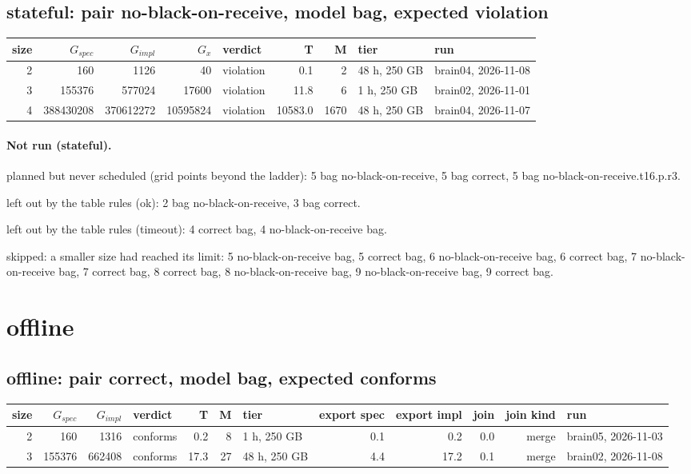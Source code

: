 \documentclass[10pt]{article}
\begin{document}
\subsection*{stateful: pair \textsf{no-black-on-receive}, model bag, expected violation}
\begin{longtable}{@{}rrrrlrrll@{}}
\toprule
size & $G_{\mathit{spec}}$ & $G_{\mathit{impl}}$ & $G_x$ & verdict & T & M & tier & run \\
\midrule
\endhead
\color{blue} 2 & 160 & 1126 & 40 & violation & 0.1 & 2 & 48 h, 250 GB & brain04, 2026-11-08 \\
\color{blue} 3 & 155376 & 577024 & 17600 & violation & 11.8 & 6 & 1 h, 250 GB & brain02, 2026-11-01 \\
\color{blue} 4 & 388430208 & 370612272 & 10595824 & violation & 10583.0 & 1670 & 48 h, 250 GB & brain04, 2026-11-07 \\
\bottomrule
\end{longtable}
\paragraph{Not run (stateful).}
planned but never scheduled (grid points beyond the ladder): 5 bag no-black-on-receive, 5 bag correct, 5 bag no-black-on-receive.t16.p.r3.\par
left out by the table rules (ok): 2 bag no-black-on-receive, 3 bag correct.\par
left out by the table rules (timeout): 4 correct bag, 4 no-black-on-receive bag.\par
skipped: a smaller size had reached its limit: 5 no-black-on-receive bag, 5 correct bag, 6 no-black-on-receive bag, 6 correct bag, 7 no-black-on-receive bag, 7 correct bag, 8 correct bag, 8 no-black-on-receive bag, 9 no-black-on-receive bag, 9 correct bag.\par
\section*{offline}
\subsection*{offline: pair \textsf{correct}, model bag, expected conforms}
\begin{longtable}{@{}rrrlrrlrrrrl@{}}
\toprule
size & $G_{\mathit{spec}}$ & $G_{\mathit{impl}}$ & verdict & T & M & tier & export spec & export impl & join & join kind & run \\
\midrule
\endhead
\color{blue} 2 & 160 & 1316 & conforms & 0.2 & 8 & 1 h, 250 GB & 0.1 & 0.2 & 0.0 & merge & brain05, 2026-11-03 \\
\color{blue} 3 & 155376 & 662408 & conforms & 17.3 & 27 & 48 h, 250 GB & 4.4 & 17.2 & 0.1 & merge & brain02, 2026-11-08 \\
\bottomrule
\end{longtable}
\end{document}
